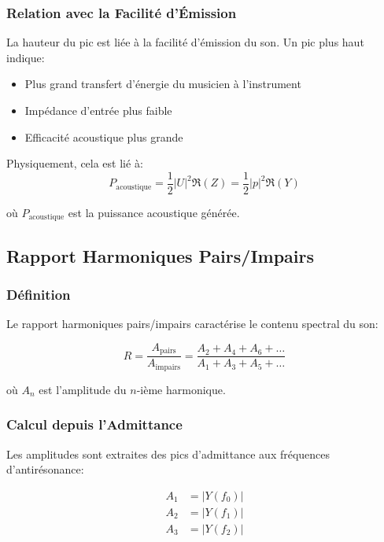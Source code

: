 \documentclass[12pt,a4paper,twocolumn]{article}
\newcommand{\impedance}{Z}
\newcommand{\admittance}{Y}
\newcommand{\freqzero}{f_0}
\newcommand{\freqone}{f_1}
\newcommand{\freqtwo}{f_2}
\begin{document}
\subsubsection{Relation avec la Facilité d'Émission}

La hauteur du pic est liée à la facilité d'émission du son. Un pic plus haut indique:

\begin{itemize}
    \item Plus grand transfert d'énergie du musicien à l'instrument
    \item Impédance d'entrée plus faible
    \item Efficacité acoustique plus grande
\end{itemize}

Physiquement, cela est lié à:
\begin{equation}
P_{\text{acoustique}} = \frac{1}{2} |U|^2 \Re(\impedance) = \frac{1}{2} |p|^2 \Re(\admittance)
\label{eq:puissance_acoustique}
\end{equation}

où $P_{\text{acoustique}}$ est la puissance acoustique générée.

\subsection{Rapport Harmoniques Pairs/Impairs}

\subsubsection{Définition}

Le rapport harmoniques pairs/impairs caractérise le contenu spectral du son:

\begin{equation}
R = \frac{A_{\text{pairs}}}{A_{\text{impairs}}} = \frac{A_2 + A_4 + A_6 + \ldots}{A_1 + A_3 + A_5 + \ldots}
\label{eq:harmonic_ratio}
\end{equation}

où $A_n$ est l'amplitude du $n$-ième harmonique.

\subsubsection{Calcul depuis l'Admittance}

Les amplitudes sont extraites des pics d'admittance aux fréquences d'antirésonance:

\begin{align}
A_1 &= |\admittance(\freqzero)| \\
A_2 &= |\admittance(\freqone)| \\
A_3 &= |\admittance(\freqtwo)|
\label{eq:amplitudes_harmoniques}
\end{align}
\end{document}
